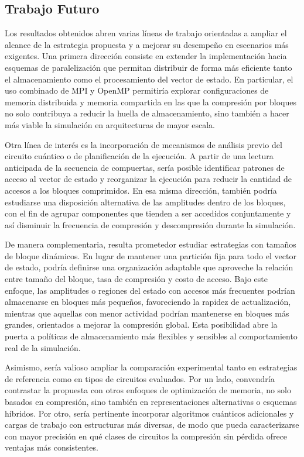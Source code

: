 \subsection{Trabajo Futuro}

Los resultados obtenidos abren varias líneas de trabajo orientadas 
a ampliar el alcance de la estrategia propuesta y a mejorar su 
desempeño en escenarios más exigentes. Una primera dirección 
consiste en extender la implementación hacia esquemas de paralelización 
que permitan distribuir de forma más eficiente tanto el almacenamiento 
como el procesamiento del vector de estado. En particular, el uso 
combinado de MPI y OpenMP permitiría explorar configuraciones de 
memoria distribuida y memoria compartida en las que la compresión 
por bloques no solo contribuya a reducir la huella de almacenamiento, 
sino también a hacer más viable la simulación en arquitecturas de mayor escala.

Otra línea de interés es la incorporación de mecanismos de análisis 
previo del circuito cuántico o de planificación de la ejecución. 
A partir de una lectura anticipada de la secuencia de compuertas, 
sería posible identificar patrones de acceso al vector de estado y 
reorganizar la ejecución para reducir la cantidad de accesos a los 
bloques comprimidos. En esa misma dirección, también podría 
estudiarse una disposición alternativa de las amplitudes dentro 
de los bloques, con el fin de agrupar componentes que tienden a 
ser accedidos conjuntamente y así disminuir la frecuencia de 
compresión y descompresión durante la simulación.

De manera complementaria, resulta prometedor estudiar estrategias 
con tamaños de bloque dinámicos. En lugar de mantener una partición 
fija para todo el vector de estado, podría definirse una organización 
adaptable que aproveche la relación entre tamaño del bloque, 
tasa de compresión y costo de acceso. Bajo este enfoque, 
las amplitudes o regiones del estado con accesos más frecuentes 
podrían almacenarse en bloques más pequeños, favoreciendo la rapidez 
de actualización, mientras que aquellas con menor actividad podrían 
mantenerse en bloques más grandes, orientados a mejorar la compresión global. 
Esta posibilidad abre la puerta a políticas de almacenamiento más flexibles 
y sensibles al comportamiento real de la simulación.

Asimismo, sería valioso ampliar la comparación experimental tanto en 
estrategias de referencia como en tipos de circuitos evaluados. 
Por un lado, convendría contrastar la propuesta con otros enfoques 
de optimización de memoria, no solo basados en compresión, 
sino también en representaciones alternativas o esquemas híbridos. 
Por otro, sería pertinente incorporar algoritmos cuánticos adicionales 
y cargas de trabajo con estructuras más diversas, de modo que pueda 
caracterizarse con mayor precisión en qué clases de circuitos la 
compresión sin pérdida ofrece ventajas más consistentes.

